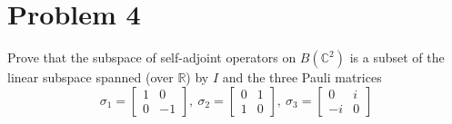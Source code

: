 \documentclass[fontsize=11pt]{scrartcl} %
\numberwithin{equation}{section} %
\numberwithin{figure}{section} %
\numberwithin{table}{section} %
\newcommand{\R}{\mathbb{R}}
\newcommand{\C}{\mathbb{C}}
\begin{document}
\newpage

\section*{Problem 4}
Prove that the subspace of self-adjoint operators on $B(\C^2)$ is a subset of
the linear subspace spanned (over $\R$) by $I$ and the three Pauli matrices
\[
\sigma_1 =
\begin{bmatrix}
    1&0\\
    0&-1
\end{bmatrix}
,\ 
\sigma_2 = 
\begin{bmatrix}
    0&1\\
    1&0
\end{bmatrix}
,\ 
\sigma_3 = 
\begin{bmatrix}
    0&i\\
    -i&0
\end{bmatrix}
\]
\end{document}
